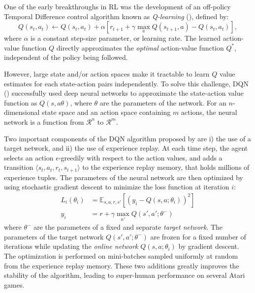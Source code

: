 \documentclass{article}
\begin{document}
    One of the early breakthroughs in RL was the development of an off-policy Temporal Difference control algorithm known as \emph{Q-learning} (\cite{qlearning}), defined by:
    \begin{equation}
        Q(s_{t}, a_{t}) \leftarrow Q(s_{t}, a_{t}) + \alpha \left[ r_{t+1} + \gamma \max_{a} Q(s_{t+1}, a) - Q(s_{t}, a_{t}) \right],
    \end{equation}
    where $\alpha$ is a constant step-size parameter, or learning rate.
    The learned action-value function $Q$ directly approximates the \emph{optimal} action-value function $Q^{*}$, independent of the policy being followed.

    However, large state and/or action spaces make it tractable to learn $Q$ value estimates for each state-action pairs independently.
    To solve this challenge, DQN (\cite{dqn}) successfully used deep neural networks to approximate the state-action value function as $Q(s, a \theta)$, where $\theta$ are the parameters of the network.
    For an $n$-dimensional state space and an action space containing $m$ actions, the neural network is a function from $\mathcal{R}^{n}$ to $\mathcal{R}^{m}$.

    Two important components of the DQN algorithm proposed by \cite{dqn} are i) the use of a target network, and ii) the use of experience replay.
    At each time step, the agent selects an action $\epsilon$-greedily with respect to the action values, and adds a transition $\langle s_{t}, a_{t}, r_{t}, s_{t+1} \rangle$ to the experience replay memory, that holds millions of experience tuples.
    The parameters of the neural network are then optimized by using stochastic gradient descent to minimize the loss function at iteration $i$:
    \begin{align}
        L_{i}(\theta_{i}) &= \mathbb{E}_{s, a, r, s'} \left[ \left( y_{i} - Q(s, a; \theta_{i}) \right)^2 \right] \\
        y_{i} &= r + \gamma \max_{a'}Q(s', a'; \theta^{-})
    \end{align}
    where $\theta^{-}$ are the parameters of a fixed and separate \emph{target network}.
    The parameters of the target network $Q(s', a'; \theta^{-})$ are frozen for a fixed number of iterations while updating the \emph{online network} $Q(s, a; \theta_{i})$ by gradient descent.
    The optimization is performed on mini-batches sampled uniformly at random from the experience replay memory.
    These two additions greatly improves the stability of the algorithm, leading to super-human performance on several Atari games.
\end{document}
